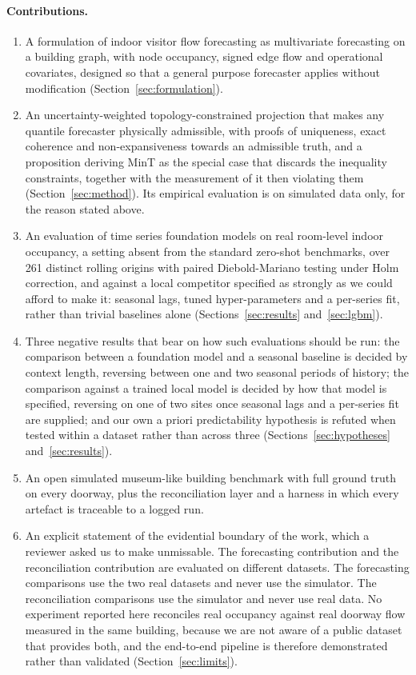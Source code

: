 \documentclass[11pt]{article}
\theoremstyle{plain}
\theoremstyle{definition}
\theoremstyle{remark}
\newif\ifrevisionmarkup
\newcommand{\new}[1]{\ifrevisionmarkup\textcolor{revision}{#1}\else#1\fi}
\begin{document}
\paragraph{Contributions.}
\begin{enumerate}\itemsep2pt
\item A formulation of indoor visitor flow forecasting as multivariate forecasting on a building graph, with node occupancy, signed edge flow and operational covariates, designed so that a general purpose forecaster applies without modification (Section~\ref{sec:formulation}).
\item An uncertainty-weighted topology-constrained projection that makes any quantile forecaster physically admissible, with proofs of uniqueness, exact coherence and non-expansiveness towards an admissible truth, and a proposition deriving MinT as the special case that discards the inequality constraints, together with the measurement of it then violating them (Section~\ref{sec:method}). \new{Its empirical evaluation is on simulated data only, for the reason stated above.}
\item An evaluation of time series foundation models on \new{real} room-level indoor occupancy, a setting absent from the standard zero-shot benchmarks, over \num{261} distinct rolling origins with paired Diebold-Mariano testing under Holm correction, and against \new{a local competitor specified as strongly as we could afford to make it: seasonal lags, tuned hyper-parameters and a per-series fit, rather than trivial baselines alone (Sections~\ref{sec:results} and~\ref{sec:lgbm})}.
\item \new{Three} negative results that bear on how such evaluations should be run: the comparison between a foundation model and a seasonal baseline is decided by context length, reversing between one and two seasonal periods of history\new{; the comparison against a trained local model is decided by how that model is specified, reversing on one of two sites once seasonal lags and a per-series fit are supplied}; and our own \new{a priori} predictability hypothesis is refuted when tested within a dataset rather than across three (Sections~\ref{sec:hypotheses} and~\ref{sec:results}).
\item An open simulated \new{museum-like building} benchmark with full ground truth on every doorway, plus the reconciliation layer and a harness in which every artefact is traceable to a logged run.
\item \new{An explicit statement of the evidential boundary of the work, which a reviewer asked us to make unmissable. The forecasting contribution and the reconciliation contribution are evaluated on different datasets. The forecasting comparisons use the two real datasets and never use the simulator. The reconciliation comparisons use the simulator and never use real data. No experiment reported here reconciles real occupancy against real doorway flow measured in the same building, because we are not aware of a public dataset that provides both, and the end-to-end pipeline is therefore demonstrated rather than validated (Section~\ref{sec:limits}).}
\end{enumerate}
\end{document}
